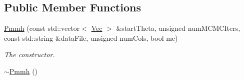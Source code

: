 \subsection*{Public Member Functions}
\begin{DoxyCompactItemize}
\item 
\hyperlink{classPmmh_aa4752fceaa1b278fcadb583865bfd0b5}{Pmmh} (const std\+::vector$<$ \hyperlink{pmfs_8h_a4c7df05c6f5e8a0d15ae14bcdbc07152}{Vec} $>$ \&start\+Theta, unsigned num\+M\+C\+M\+C\+Iters, const std\+::string \&data\+File, unsigned num\+Cols, bool mc)
\begin{DoxyCompactList}\small\item\em The constructor. \end{DoxyCompactList}\item 
\hyperlink{classPmmh_a52b058761ac6ede77eb3d8c0099e0d93}{$\sim$\+Pmmh} ()\hypertarget{classPmmh_a52b058761ac6ede77eb3d8c0099e0d93}{}\label{classPmmh_a52b058761ac6ede77eb3d8c0099e0d93}


\end{DoxyCompactItemize}
